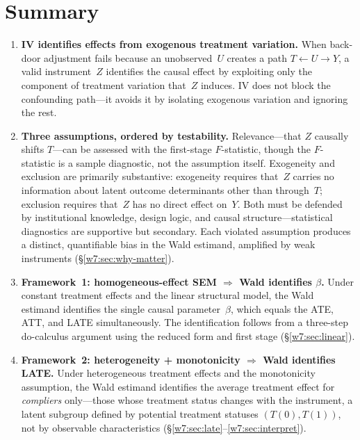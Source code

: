 \documentclass[master.tex]{subfiles}
\begin{document}
\section{Summary}
\label{w7:sec:summary}

\begin{enumerate}
  \item \textbf{IV identifies effects from exogenous treatment
    variation.}  When back-door adjustment fails because an
    unobserved~$U$ creates a path $T \leftarrow U \rightarrow Y$,
    a valid instrument~$Z$ identifies the causal effect by exploiting
    only the component of treatment variation that~$Z$ induces.  IV
    does not block the confounding path---it avoids it by isolating
    exogenous variation and ignoring the rest.

  \item \textbf{Three assumptions, ordered by testability.}
    Relevance---that $Z$ causally shifts $T$---can be assessed with
    the first-stage $F$-statistic, though the $F$-statistic is a
    sample diagnostic, not the assumption itself.  Exogeneity and
    exclusion are primarily substantive: exogeneity requires that~$Z$
    carries no information about latent outcome determinants other
    than through~$T$; exclusion requires that~$Z$ has no direct
    effect on~$Y$.  Both must be defended by institutional knowledge,
    design logic, and causal structure---statistical diagnostics are
    supportive but secondary.  Each violated assumption produces a
    distinct, quantifiable bias in the Wald estimand, amplified by
    weak instruments (\S\ref{w7:sec:why-matter}).

  \item \textbf{Framework~1: homogeneous-effect SEM
    $\Rightarrow$ Wald identifies $\beta$.}
    Under constant treatment effects and the linear structural
    model, the Wald estimand identifies the single causal
    parameter~$\beta$, which equals the ATE, ATT, and LATE
    simultaneously.  The identification follows from a three-step
    do-calculus argument using the reduced form and first stage
    (\S\ref{w7:sec:linear}).

  \item \textbf{Framework~2: heterogeneity + monotonicity
    $\Rightarrow$ Wald identifies LATE.}
    Under heterogeneous treatment effects and the monotonicity
    assumption, the Wald estimand identifies the average treatment
    effect for \emph{compliers} only---those whose treatment status
    changes with the instrument, a latent subgroup defined by
    potential treatment statuses $(T(0), T(1))$, not by observable
    characteristics (\S\ref{w7:sec:late}--\ref{w7:sec:interpret}).


\end{enumerate}
\end{document}
